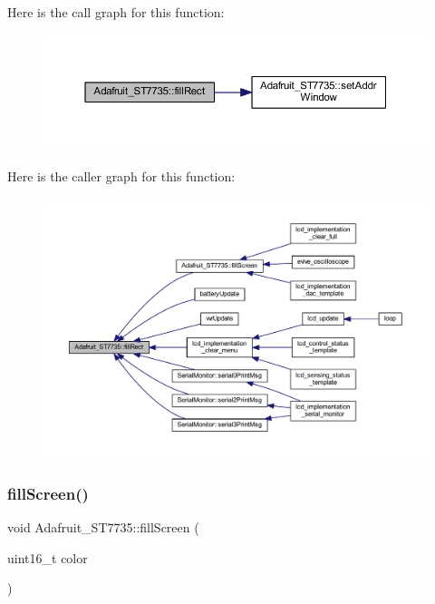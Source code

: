 Here is the call graph for this function\+:
\nopagebreak
\begin{figure}[H]
\begin{center}
\leavevmode
\includegraphics[width=350pt]{dd/dee/class_adafruit___s_t7735_a3556265c5b017cd2cdceb1f34e9bc421_cgraph}
\end{center}
\end{figure}
Here is the caller graph for this function\+:
\nopagebreak
\begin{figure}[H]
\begin{center}
\leavevmode
\includegraphics[width=350pt]{dd/dee/class_adafruit___s_t7735_a3556265c5b017cd2cdceb1f34e9bc421_icgraph}
\end{center}
\end{figure}
\mbox{\label{class_adafruit___s_t7735_af732d3d78239687718bb117de99418ca}} 
\subsubsection{\texorpdfstring{fill\+Screen()}{fillScreen()}}
{\footnotesize\ttfamily void Adafruit\+\_\+\+S\+T7735\+::fill\+Screen (\begin{DoxyParamCaption}\item[{uint16\+\_\+t}]{color }\end{DoxyParamCaption})}

